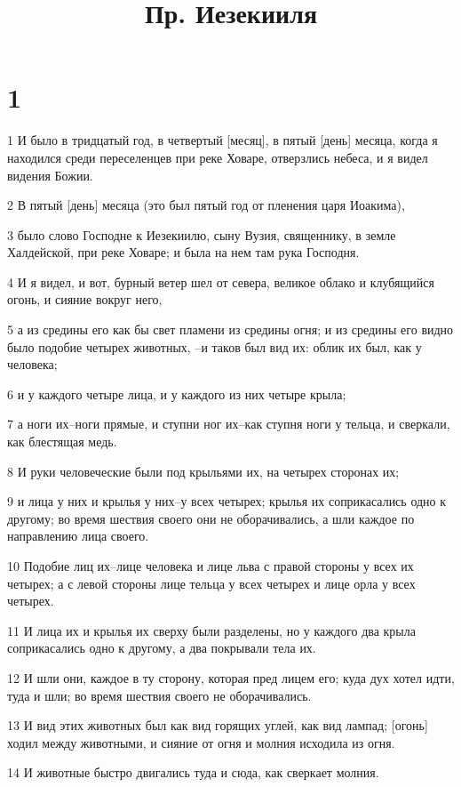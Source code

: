 

\title{Пр. Иезекииля}


\chapter{1}

\par 1 И было в тридцатый год, в четвертый [месяц], в пятый [день] месяца, когда я находился среди переселенцев при реке Ховаре, отверзлись небеса, и я видел видения Божии.
\par 2 В пятый [день] месяца (это был пятый год от пленения царя Иоакима),
\par 3 было слово Господне к Иезекиилю, сыну Вузия, священнику, в земле Халдейской, при реке Ховаре; и была на нем там рука Господня.
\par 4 И я видел, и вот, бурный ветер шел от севера, великое облако и клубящийся огонь, и сияние вокруг него,
\par 5 а из средины его как бы свет пламени из средины огня; и из средины его видно было подобие четырех животных, --и таков был вид их: облик их был, как у человека;
\par 6 и у каждого четыре лица, и у каждого из них четыре крыла;
\par 7 а ноги их--ноги прямые, и ступни ног их--как ступня ноги у тельца, и сверкали, как блестящая медь.
\par 8 И руки человеческие были под крыльями их, на четырех сторонах их;
\par 9 и лица у них и крылья у них--у всех четырех; крылья их соприкасались одно к другому; во время шествия своего они не оборачивались, а шли каждое по направлению лица своего.
\par 10 Подобие лиц их--лице человека и лице льва с правой стороны у всех их четырех; а с левой стороны лице тельца у всех четырех и лице орла у всех четырех.
\par 11 И лица их и крылья их сверху были разделены, но у каждого два крыла соприкасались одно к другому, а два покрывали тела их.
\par 12 И шли они, каждое в ту сторону, которая пред лицем его; куда дух хотел идти, туда и шли; во время шествия своего не оборачивались.
\par 13 И вид этих животных был как вид горящих углей, как вид лампад; [огонь] ходил между животными, и сияние от огня и молния исходила из огня.
\par 14 И животные быстро двигались туда и сюда, как сверкает молния.
